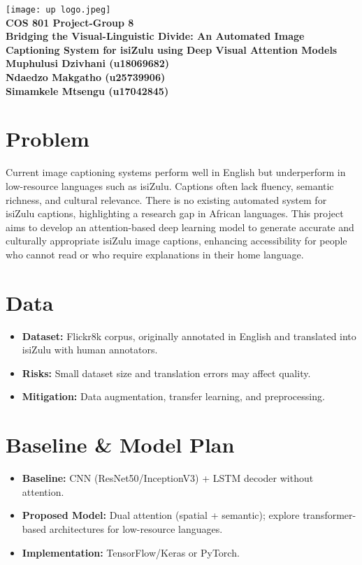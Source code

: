 \documentclass[12pt]{article}
\begin{document}
\begin{center}
    \texttt{[image: up logo.jpeg]}\\[0.8em]
    \textbf{COS 801 Project-Group 8}\\[0.3em]
    \large \textbf{Bridging the Visual-Linguistic Divide: An Automated Image Captioning System for isiZulu using Deep Visual Attention Models}\\[1em]
    \normalsize
    \textbf{Muphulusi Dzivhani (u18069682)} \\
    \textbf{Ndaedzo Makgatho (u25739906)} \\
    \textbf{Simamkele Mtsengu (u17042845)}
\end{center}

\section{Problem}
Current image captioning systems perform well in English but underperform in low-resource languages such as isiZulu. Captions often lack fluency, semantic richness, and cultural relevance. There is no existing automated system for isiZulu captions, highlighting a research gap in African languages. This project aims to develop an attention-based deep learning model to generate accurate and culturally appropriate isiZulu image captions, enhancing accessibility for people who cannot read or who require explanations in their home language.

\section{Data}
\begin{itemize}[leftmargin=*,noitemsep]
    \item \textbf{Dataset:} Flickr8k corpus, originally annotated in English and translated into isiZulu with human annotators.
    \item \textbf{Risks:} Small dataset size and translation errors may affect quality.
    \item \textbf{Mitigation:} Data augmentation, transfer learning, and preprocessing.
\end{itemize}

\section{Baseline \& Model Plan}
\begin{itemize}[leftmargin=*,noitemsep]
    \item \textbf{Baseline:} CNN (ResNet50/InceptionV3) + LSTM decoder without attention.
    \item \textbf{Proposed Model:} Dual attention (spatial + semantic); explore transformer-based architectures for low-resource languages.
    \item \textbf{Implementation:} TensorFlow/Keras or PyTorch.
\end{itemize}
\end{document}
